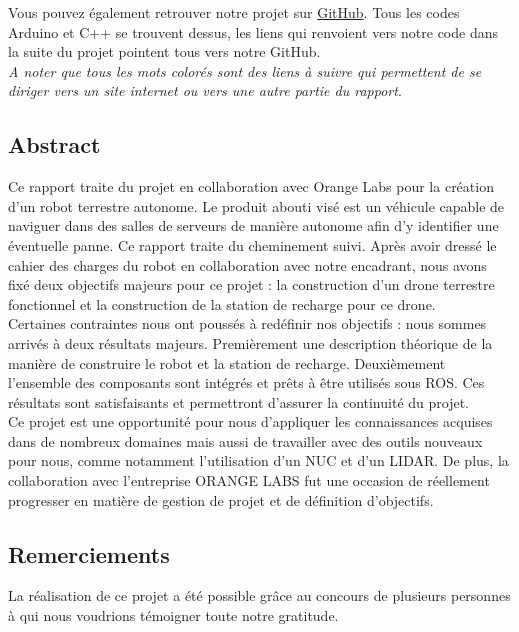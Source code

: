 \documentclass[french]{rapportENSTAB}
\begin{document}
Vous pouvez également retrouver notre projet sur \href{https://github.com/AntoninLize/Projet_OrangeLabs}{GitHub}. Tous les codes Arduino et C++ se trouvent dessus, les liens qui renvoient vers notre code dans la suite du projet pointent tous vers notre GitHub. \\

\textit{A noter que tous les mots colorés sont des liens à suivre qui permettent de se diriger vers un site internet ou vers une autre partie du rapport}.
\\


\subsection{Abstract}

Ce rapport traite du projet en collaboration avec Orange Labs pour la création d’un robot terrestre  autonome. Le produit abouti visé est un véhicule capable de naviguer dans des salles de serveurs de manière autonome afin d’y identifier une éventuelle panne. Ce rapport traite du cheminement suivi. 
Après avoir dressé le cahier des charges du robot en collaboration avec notre encadrant, nous avons fixé deux objectifs majeurs pour ce projet : la construction d’un drone terrestre fonctionnel et la construction de la station de recharge pour ce drone. \\

Certaines contraintes nous ont poussés à redéfinir nos objectifs : nous sommes arrivés à deux résultats majeurs. Premièrement une description théorique de la manière de construire le robot et la station de recharge. Deuxièmement l’ensemble des composants sont intégrés et prêts à être utilisés sous ROS. Ces résultats sont satisfaisants et permettront d’assurer la continuité du projet. \\

Ce projet est une opportunité pour nous d’appliquer les connaissances acquises dans de nombreux domaines mais aussi de travailler avec des outils nouveaux pour nous, comme notamment l’utilisation d’un NUC et d’un LIDAR. De plus, la collaboration avec l’entreprise ORANGE LABS fut une occasion de réellement progresser en matière de gestion de projet et de définition d’objectifs.
\\

\subsection{Remerciements}
La réalisation de ce projet a été possible grâce au concours de plusieurs personnes à qui nous voudrions témoigner toute notre gratitude.\\ 
\end{document}

